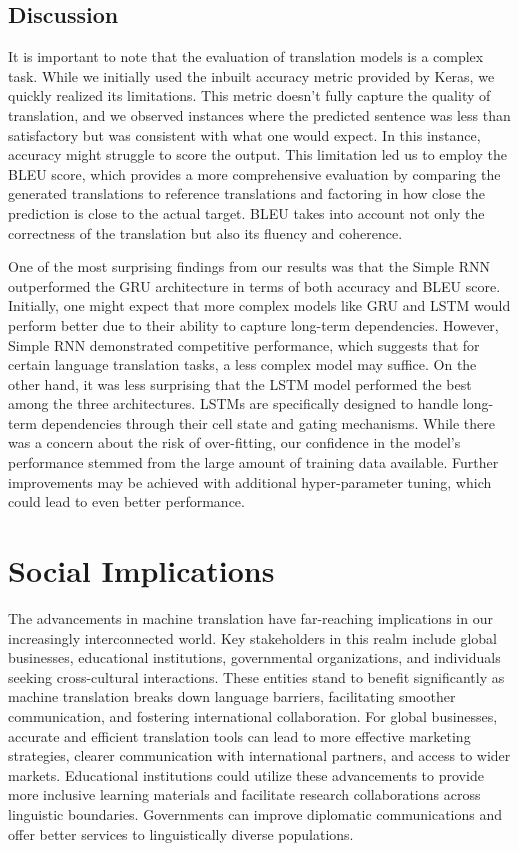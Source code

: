 \documentclass{article}
\begin{document}
\subsection{Discussion}

It is important to note that the evaluation of translation models is a complex task. While we initially used the inbuilt accuracy metric provided by Keras, we quickly realized its limitations. This metric doesn't fully capture the quality of translation, and we observed instances where the predicted sentence was less than satisfactory but was consistent with what one would expect. In this instance, accuracy might struggle to score the output. This limitation led us to employ the BLEU score, which provides a more comprehensive evaluation by comparing the generated translations to reference translations and factoring in how close the prediction is close to the actual target. BLEU takes into account not only the correctness of the translation but also its fluency and coherence.

One of the most surprising findings from our results was that the Simple RNN outperformed the GRU architecture in terms of both accuracy and BLEU score. Initially, one might expect that more complex models like GRU and LSTM would perform better due to their ability to capture long-term dependencies. However, Simple RNN demonstrated competitive performance, which suggests that for certain language translation tasks, a less complex model may suffice.
On the other hand, it was less surprising that the LSTM model performed the best among the three architectures. LSTMs are specifically designed to handle long-term dependencies through their cell state and gating mechanisms. While there was a concern about the risk of over-fitting, our confidence in the model's performance stemmed from the large amount of training data available. Further improvements may be achieved with additional hyper-parameter tuning, which could lead to even better performance.



\section{Social Implications}
The advancements in machine translation have far-reaching implications in our increasingly interconnected world. Key stakeholders in this realm include global businesses, educational institutions, governmental organizations, and individuals seeking cross-cultural interactions. These entities stand to benefit significantly as machine translation breaks down language barriers, facilitating smoother communication, and fostering international collaboration. For global businesses, accurate and efficient translation tools can lead to more effective marketing strategies, clearer communication with international partners, and access to wider markets. Educational institutions could utilize these advancements to provide more inclusive learning materials and facilitate research collaborations across linguistic boundaries. Governments can improve diplomatic communications and offer better services to linguistically diverse populations.
\end{document}
